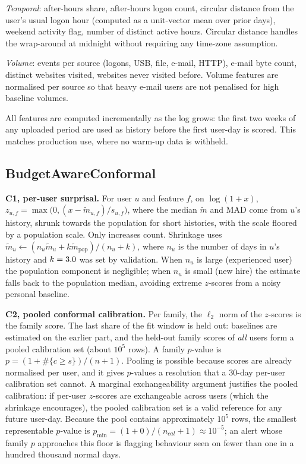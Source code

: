 \documentclass[conference]{IEEEtran}
\begin{document}
\emph{Temporal}: after-hours share, after-hours logon count, circular distance from the user's
usual logon hour (computed as a unit-vector mean over prior days), weekend activity flag,
number of distinct active hours. Circular distance handles the wrap-around at midnight without
requiring any time-zone assumption.

\emph{Volume}: events per source (logons, USB, file, e-mail, HTTP), e-mail byte count, distinct
websites visited, websites never visited before. Volume features are normalised per source so that
heavy e-mail users are not penalised for high baseline volumes.

All features are computed incrementally as the log grows: the first two weeks of any uploaded
period are used as history before the first user-day is scored. This matches production use,
where no warm-up data is withheld.

\subsection{BudgetAwareConformal}
\textbf{C1, per-user surprisal.} For user $u$ and feature $f$, on $\log(1+x)$,
$z_{u,f}=\max\bigl(0,(x-\tilde m_{u,f})/s_{u,f}\bigr)$, where the median $\tilde m$ and MAD come
from $u$'s history, shrunk towards the population for short histories, with the scale floored by a
population scale. Only increases count. Shrinkage uses $\tilde m_u \leftarrow
(n_u\tilde m_u + k\tilde m_{\text{pop}})/(n_u+k)$, where $n_u$ is the number of days in $u$'s
history and $k=3.0$ was set by validation. When $n_u$ is large (experienced user) the
population component is negligible; when $n_u$ is small (new hire) the estimate falls back to the
population median, avoiding extreme $z$-scores from a noisy personal baseline.

\textbf{C2, pooled conformal calibration.} Per family, the $\ell_2$ norm of the $z$-scores is the
family score. The last \TunedCal{} share of the fit window is held out: baselines are estimated on
the earlier part, and the held-out family scores of \emph{all} users form a pooled calibration
set (about $10^5$ rows). A family $p$-value is $p=(1+\#\{c\ge s\})/(n+1)$. Pooling is possible
because scores are already normalised per user, and it gives $p$-values a resolution that a
30-day per-user calibration set cannot. A marginal exchangeability argument justifies the pooled
calibration: if per-user $z$-scores are exchangeable across users (which the shrinkage encourages),
the pooled calibration set is a valid reference for any future user-day. Because the pool contains
approximately $10^5$ rows, the smallest representable $p$-value is $p_{\min}=(1+0)/(n_{cal}+1)
\approx 10^{-5}$; an alert whose family $p$ approaches this floor is flagging behaviour seen on
fewer than one in a hundred thousand normal days.
\end{document}
